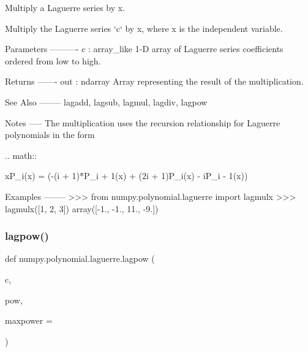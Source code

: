 \begin{DoxyVerb}Multiply a Laguerre series by x.

Multiply the Laguerre series `c` by x, where x is the independent
variable.


Parameters
----------
c : array_like
    1-D array of Laguerre series coefficients ordered from low to
    high.

Returns
-------
out : ndarray
    Array representing the result of the multiplication.

See Also
--------
lagadd, lagsub, lagmul, lagdiv, lagpow

Notes
-----
The multiplication uses the recursion relationship for Laguerre
polynomials in the form

.. math::

xP_i(x) = (-(i + 1)*P_{i + 1}(x) + (2i + 1)P_{i}(x) - iP_{i - 1}(x))

Examples
--------
>>> from numpy.polynomial.laguerre import lagmulx
>>> lagmulx([1, 2, 3])
array([-1.,  -1.,  11.,  -9.])\end{DoxyVerb}
 \mbox{\label{namespacenumpy_1_1polynomial_1_1laguerre_aa17d8c1abad13989af8c7670531f8081}} 
\subsubsection{\texorpdfstring{lagpow()}{lagpow()}}
{\footnotesize\ttfamily def numpy.\+polynomial.\+laguerre.\+lagpow (\begin{DoxyParamCaption}\item[{}]{c,  }\item[{}]{pow,  }\item[{}]{maxpower = {} }\end{DoxyParamCaption})}


